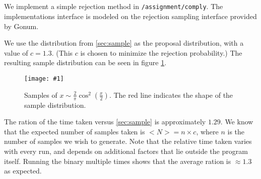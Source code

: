 \documentclass[10pt, a4paper]{article}
\newcommand{\plot}[3]{\begin{figure}[ht]\centering\texttt{[image: \#1]}\caption{#2}\label{#3}\end{figure}}
\begin{document}
  \subsection{}
  We implement a simple rejection method in \texttt{/assignment/comply}. The implementations
  interface is modeled on the rejection sampling interface provided by Gonum.

  We use the distribution from \ref{sec:sample} as the proposal distribution, with a value
  of $c = 1.3$. (This $c$ is chosen to minimize the rejection probability.) The resulting
  sample distribution can be seen in figure \ref{fig:reject}.

  \plot{assignment-q-5-c}{
    Samples of $x \sim \frac{2}{\pi} \cos^2(\frac{x}{2})$. The red line indicates the shape of
    the sample distribution.
  }{fig:reject}

  The ration of the time taken versus \ref{sec:sample} is approximately $1.29$. We know that the
  expected number of samples taken is $<N> = n \times c$, where $n$ is the number of samples we
  wish to generate. Note that the relative time taken varies with every run, and depends on additional
  factors that lie outside the program itself. Running the binary multiple times shows that the
  average ration is $\approx 1.3$ as expected.

{}

\end{document}
